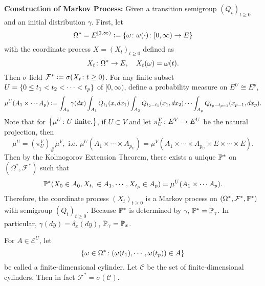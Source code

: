 \noindent \textbf{Construction of Markov Process:} Given a transition semigroup $(Q_t)_{t \geq 0}$ and an initial distribution $\gamma$. First, let
\begin{equation*}
    \Omega^* = E^{[0,\infty)} \vcentcolon= \left\{\omega \colon \omega(\cdot) \colon [0,\infty) \rightarrow E\right\}
\end{equation*}
with the coordinate process $X=(X_t)_{t \geq 0}$ defined as
\begin{equation*}
    X_t \colon \Omega^* \rightarrow E,\quad X_t(\omega) = \omega(t).
\end{equation*}
Then $\sigma$-field $\mathcal{F}^* \vcentcolon= \sigma(X_t \colon t \geq 0)$. For any finite subset $U = \left\{0\leq t_1 < t_2 < \cdots < t_p\right\}$ of $[0,\infty)$, define a probability measure on $E^U \cong E^p$,
\begin{equation*}
    \mu^U(A_1\times \cdots A_p) \vcentcolon= \int_{A_0} \gamma(dx) \int_{A_1} Q_{t_1}(x,dx_1) \int_{A_2} Q_{t_2-t_1}(x_1,dx_2) \cdots \int_{A_p}Q_{t_p-t_{p-1}}(x_{p-1},dx_p).
\end{equation*}
Note that for $\left\{\mu^U\colon U \text{ finite}.\right\}$, if $U \subset V$ and let $\pi_U^V \colon E^V \rightarrow E^U$ be the natural projection, then
\begin{equation*}
    \mu^U = (\pi^V_U)_{\#}\mu^V,\text{ i.e. } \mu^U(A_1 \times \cdots \times A_{p_U}) = \mu^V(A_1 \times \cdots \times A_{p_U} \times E \times \cdots \times E).
\end{equation*}
Then by the Kolmogorov Extension Theorem, there exists a unique $\mathbb{P}^*$ on $(\Omega^*, \mathcal{F}^*)$ such that
\begin{equation*}
    \mathbb{P}^*(X_0 \in A_0,X_{t_1} \in A_1,\cdots, X_{t_p} \in A_p) = \mu^U(A_1\times \cdots A_p).
\end{equation*}
Therefore, the coordinate process $(X_t)_{t \geq 0}$ is a Markov process on $(\Omega^*,\mathcal{F}^*,\mathbb{P}^*)$ with semigroup $(Q_t)_{t \geq 0}$. Because $\mathbb{P}^*$ is determined by $\gamma$, $\mathbb{P}^* = \mathbb{P}_\gamma$. In particular, $\gamma(dy) = \delta_x(dy)$, $\mathbb{P}_\gamma = \mathbb{P}_x$.
\begin{rmk}
    For $A \in \mathcal{E}^U$, let
    \begin{equation*}
        \left\{\omega \in \Omega^* \colon (\omega(t_1),\cdots,\omega(t_p)) \in A\right\}
    \end{equation*}
    be called a finite-dimensional cylinder. Let $\mathcal{C}$ be the set of finite-dimensional cylinders. Then in fact $\mathcal{F}^* = \sigma(\mathcal{C})$. 
\end{rmk}

